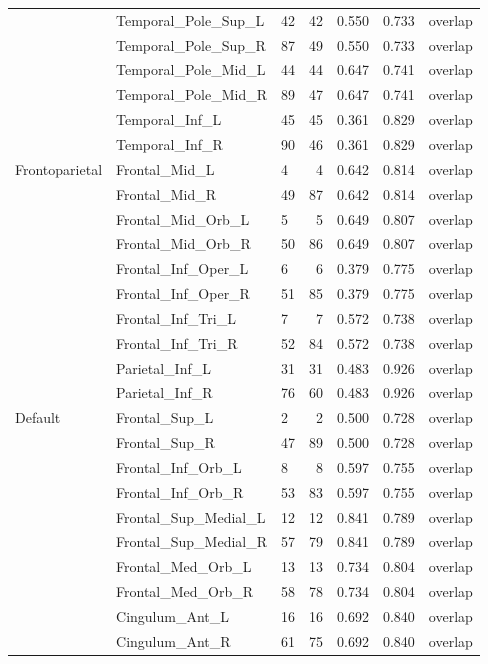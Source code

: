 \documentclass[a4paper,10pt]{article}
\begin{document}
\begin{longtable}{lllrrrl}
 & Temporal\_Pole\_Sup\_L & 42 & 42 & 0.550 & 0.733 & overlap \\
 & Temporal\_Pole\_Sup\_R & 87 & 49 & 0.550 & 0.733 & overlap \\
 & Temporal\_Pole\_Mid\_L & 44 & 44 & 0.647 & 0.741 & overlap \\
 & Temporal\_Pole\_Mid\_R & 89 & 47 & 0.647 & 0.741 & overlap \\
 & Temporal\_Inf\_L & 45 & 45 & 0.361 & 0.829 & overlap \\
 & Temporal\_Inf\_R & 90 & 46 & 0.361 & 0.829 & overlap \\
\midrule
Frontoparietal & Frontal\_Mid\_L & 4 & 4 & 0.642 & 0.814 & overlap \\
 & Frontal\_Mid\_R & 49 & 87 & 0.642 & 0.814 & overlap \\
 & Frontal\_Mid\_Orb\_L & 5 & 5 & 0.649 & 0.807 & overlap \\
 & Frontal\_Mid\_Orb\_R & 50 & 86 & 0.649 & 0.807 & overlap \\
 & Frontal\_Inf\_Oper\_L & 6 & 6 & 0.379 & 0.775 & overlap \\
 & Frontal\_Inf\_Oper\_R & 51 & 85 & 0.379 & 0.775 & overlap \\
 & Frontal\_Inf\_Tri\_L & 7 & 7 & 0.572 & 0.738 & overlap \\
 & Frontal\_Inf\_Tri\_R & 52 & 84 & 0.572 & 0.738 & overlap \\
 & Parietal\_Inf\_L & 31 & 31 & 0.483 & 0.926 & overlap \\
 & Parietal\_Inf\_R & 76 & 60 & 0.483 & 0.926 & overlap \\
\midrule
Default & Frontal\_Sup\_L & 2 & 2 & 0.500 & 0.728 & overlap \\
 & Frontal\_Sup\_R & 47 & 89 & 0.500 & 0.728 & overlap \\
 & Frontal\_Inf\_Orb\_L & 8 & 8 & 0.597 & 0.755 & overlap \\
 & Frontal\_Inf\_Orb\_R & 53 & 83 & 0.597 & 0.755 & overlap \\
 & Frontal\_Sup\_Medial\_L & 12 & 12 & 0.841 & 0.789 & overlap \\
 & Frontal\_Sup\_Medial\_R & 57 & 79 & 0.841 & 0.789 & overlap \\
 & Frontal\_Med\_Orb\_L & 13 & 13 & 0.734 & 0.804 & overlap \\
 & Frontal\_Med\_Orb\_R & 58 & 78 & 0.734 & 0.804 & overlap \\
 & Cingulum\_Ant\_L & 16 & 16 & 0.692 & 0.840 & overlap \\
 & Cingulum\_Ant\_R & 61 & 75 & 0.692 & 0.840 & overlap \\

\end{longtable}
\end{document}
